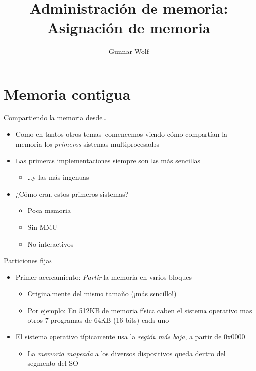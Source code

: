 \documentclass[presentation]{beamer}
\author{Gunnar Wolf}
\date{}
\title{Administración de memoria: Asignación de memoria}
\begin{document}
\maketitle
\section{Memoria contigua}
\label{sec:org5f5275c}

\begin{frame}[label={sec:org74e6236}]{Compartiendo la memoria desde\ldots{}}
\begin{itemize}
\item Como en tantos otros temas, comencemos viendo cómo compartían la
memoria los \emph{primeros} sistemas multiprocesados
\item Las primeras implementaciones siempre son las más sencillas
\begin{itemize}
\item \ldots{}y las más ingenuas
\end{itemize}
\item ¿Cómo eran estos primeros sistemas?
\begin{itemize}
\item Poca memoria
\item Sin MMU
\item No interactivos
\end{itemize}
\end{itemize}
\end{frame}

\begin{frame}[label={sec:orge9d69d7}]{Particiones fijas}
\begin{itemize}
\item Primer acercamiento: \emph{Partir} la memoria en varios bloques
\begin{itemize}
\item Originalmente del mismo tamaño (¡más sencillo!)
\item Por ejemplo: En 512KB de memoria física caben el sistema
operativo mas otros 7 programas de 64KB (16 bits) cada uno
\end{itemize}
\item El sistema operativo típicamente usa la \emph{región más baja}, a partir
de 0x0000
\begin{itemize}
\item La \emph{memoria mapeada} a los diversos dispositivos queda dentro del
segmento del SO
\end{itemize}
\end{itemize}
\end{frame}
\end{document}
